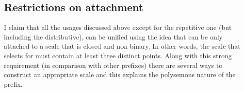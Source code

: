 
\subsection{Restrictions on attachment}
I claim that all the usages discussed above except for the repetitive one (but including the distributive), can be unified using the idea that  can be only attached to a scale that is closed and non-binary. In other words, the scale that  selects for must contain at least three distinct points. Along with this strong requirement (in comparison with other prefixes) there are several ways to construct an appropriate scale and this explains the polysemous nature of the prefix. 


